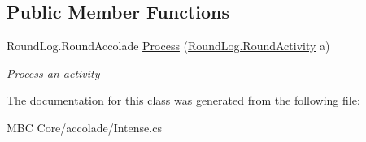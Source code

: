 \subsection*{Public Member Functions}
\begin{DoxyCompactItemize}
\item 
\hypertarget{class_m_b_c_1_1_core_1_1mbc_1_1accolade_1_1_intense_ae3a4c37d563f8c4e1399e75ffdb10866}{Round\-Log.\-Round\-Accolade \hyperlink{class_m_b_c_1_1_core_1_1mbc_1_1accolade_1_1_intense_ae3a4c37d563f8c4e1399e75ffdb10866}{Process} (\hyperlink{class_m_b_c_1_1_core_1_1_round_log_1_1_round_activity}{Round\-Log.\-Round\-Activity} a)}\label{class_m_b_c_1_1_core_1_1mbc_1_1accolade_1_1_intense_ae3a4c37d563f8c4e1399e75ffdb10866}

\begin{DoxyCompactList}\small\item\em Process an activity\end{DoxyCompactList}\end{DoxyCompactItemize}


The documentation for this class was generated from the following file\-:\begin{DoxyCompactItemize}
\item 
M\-B\-C Core/accolade/Intense.\-cs\end{DoxyCompactItemize}
